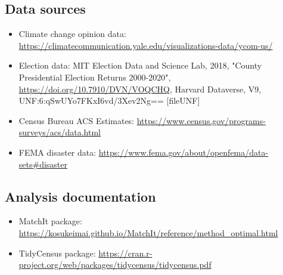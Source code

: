\documentclass{article}
\begin{document}
\subsection{Data sources}
\begin{itemize}
	\item Climate change opinion data: \url{https://climatecommunication.yale.edu/visualizations-data/ycom-us/}
	\item Election data: MIT Election Data and Science Lab, 2018, "County Presidential Election Returns 2000-2020", \url{https://doi.org/10.7910/DVN/VOQCHQ}, Harvard Dataverse, V9, UNF:6:qSwUYo7FKxI6vd/3Xev2Ng== [fileUNF]
	\item Census Bureau ACS Estimates: \url{https://www.census.gov/programs-surveys/acs/data.html}
	\item FEMA disaster data: \url{https://www.fema.gov/about/openfema/data-sets#disaster}
\end{itemize}

\subsection{Analysis documentation}
\begin{itemize}
	\item MatchIt package: \url{https://kosukeimai.github.io/MatchIt/reference/method_optimal.html}
	\item TidyCensus package: \url{https://cran.r-project.org/web/packages/tidycensus/tidycensus.pdf}
\end{itemize}
\end{document}
